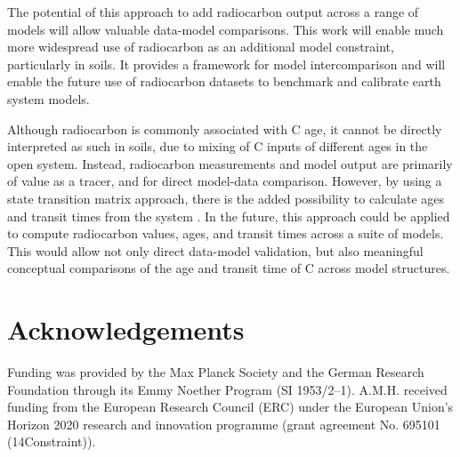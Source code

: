 \documentclass[11pt,a4paper]{article}
\begin{document}
The potential of this approach to add radiocarbon output across a range of models will allow valuable data-model comparisons. This work will enable much more widespread use of radiocarbon as an additional model constraint, particularly in soils. It provides a framework for model intercomparison and will enable the future use of radiocarbon datasets to benchmark and calibrate earth system models.

Although radiocarbon is commonly associated with C age, it cannot be directly interpreted as such in soils, due to mixing of C inputs of different ages in the open system. Instead, radiocarbon measurements and model output are primarily of value as a tracer, and for direct model-data comparison. However, by using a state transition matrix approach, there is the added possibility to calculate ages and transit times from the system \citep{Metzler2018PNAS}. In the future, this approach could be applied to compute radiocarbon values, ages, and transit times across a suite of models. This would allow not only direct data-model validation, but also meaningful conceptual comparisons of the age and transit time of C across model structures. 


\section*{Acknowledgements}
Funding was provided by the Max Planck Society and the German Research Foundation through its Emmy Noether Program (SI 1953/2--1). A.M.H. received funding from the European Research Council (ERC) under the European Union’s Horizon 2020 research and innovation programme (grant agreement No. 695101 (14Constraint)).   


%

\end{document}
